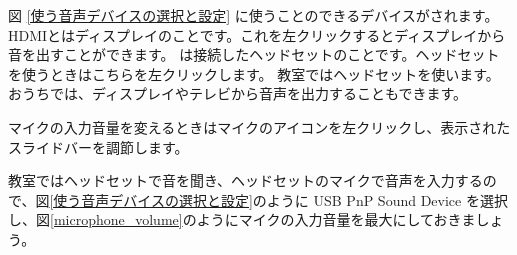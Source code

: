 図 \ref{使う音声デバイスの選択と設定} に使うことのできるデバイスがされます。HDMIとはディスプレイのことです。これを左クリックするとディスプレイから音を出すことができます。   は接続したヘッドセットのことです。ヘッドセットを使うときはこちらを左クリックします。
教室ではヘッドセットを使います。おうちでは、ディスプレイやテレビから音声を出力することもできます。

マイクの入力音量を変えるときはマイクのアイコンを左クリックし、表示されたスライドバーを調節します。



教室ではヘッドセットで音を聞き、ヘッドセットのマイクで音声を入力するので、図\ref{使う音声デバイスの選択と設定}のように USB PnP Sound Device を選択し、図\ref{microphone_volume}のようにマイクの入力音量を最大にしておきましょう。
